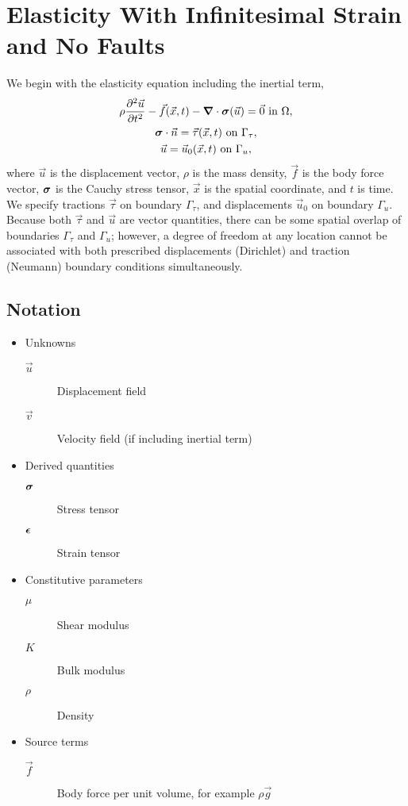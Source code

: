 \section{Elasticity With Infinitesimal Strain and No Faults}

We begin with the elasticity equation including the inertial term,
\begin{gather}
  \label{eqn:elasticity:strong:form}
  \rho \frac{\partial^2\vec{u}}{\partial t^2} - \vec{f}(\vec{x},t) - \tensor{\nabla} \cdot 
\tensor{\sigma}
(\vec{u}) = \vec{0} \text{ in }\Omega, \\
%
  \label{eqn:bc:Neumann}
  \tensor{\sigma} \cdot \vec{n} = \vec{\tau}(\vec{x},t) \text{ on }\Gamma_\tau, \\
%
  \label{eqn:bc:Dirichlet}
  \vec{u} = \vec{u}_0(\vec{x},t) \text{ on }\Gamma_u,
\end{gather}
where $\vec{u}$ is the displacement vector, $\rho$ is the mass
density, $\vec{f}$ is the body force vector, $\bm{\sigma}$ is the
Cauchy stress tensor, $\vec{x}$ is the spatial coordinate, and $t$ is
time. We specify tractions $\vec{\tau}$ on boundary $\Gamma_\tau$, and
displacements $\vec{u}_0$ on boundary $\Gamma_u$. Because both $\vec{\tau}$
and $\vec{u}$ are vector quantities, there can be some spatial overlap
of boundaries $\Gamma_\tau$ and $\Gamma_u$; however, a degree of freedom at
any location cannot be associated with both prescribed displacements
(Dirichlet) and traction (Neumann) boundary conditions simultaneously.

\subsection{Notation}
\begin{itemize}
\item Unknowns
  \begin{description}
  \item[$\vec{u}$] Displacement field
  \item[$\vec{v}$] Velocity field (if including inertial term)
  \end{description}
\item Derived quantities
  \begin{description}
    \item[$\bm{\sigma}$] Stress tensor
    \item[$\bm{\epsilon}$] Strain tensor
  \end{description}
\item Constitutive parameters
  \begin{description}
  \item[$\mu$] Shear modulus
  \item[$K$] Bulk modulus
  \item[$\rho$] Density
  \end{description}
\item Source terms
  \begin{description}
    \item[$\vec{f}$] Body force per unit volume, for example $\rho \vec{g}$
  \end{description}
\end{itemize}

